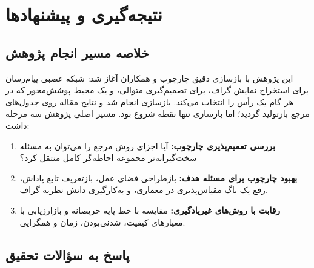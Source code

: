 \chapter{نتیجه‌گیری و پیشنهادها}
\label{ch:conclusion}

\section{خلاصه مسیر انجام پژوهش}
\label{sec:summary}

این پژوهش با بازسازی دقیق چارچوب  و همکاران آغاز شد: شبکه عصبی
پیام‌رسان برای استخراج نمایش گراف،  برای تصمیم‌گیری متوالی، و یک
محیط پوشش‌محور که در هر گام یک رأس را انتخاب می‌کند. بازسازی انجام شد و نتایج
مقاله روی جدول‌های مرجع بازتولید گردید؛ اما بازسازی تنها نقطه شروع بود. مسیر
اصلی پژوهش سه مرحله داشت:

\begin{enumerate}
  \item \textbf{بررسی تعمیم‌پذیری چارچوب:} آیا اجزای روش مرجع را می‌توان به
        مسئله سخت‌گیرانه‌تر مجموعه احاطه‌گر کامل منتقل کرد؟
  \item \textbf{بهبود چارچوب برای مسئله هدف:} بازطراحی فضای عمل، بازتعریف تابع
        پاداش، رفع یک باگ مقیاس‌پذیری در معماری، و به‌کارگیری دانش نظریه گراف.
  \item \textbf{رقابت با روش‌های غیر‌یادگیری:} مقایسه با خط پایه حریصانه و
        بازارزیابی  با معیارهای کیفیت، شدنی‌بودن، زمان و همگرایی.
\end{enumerate}

\section{پاسخ به سؤالات تحقیق}
\label{sec:answers}

